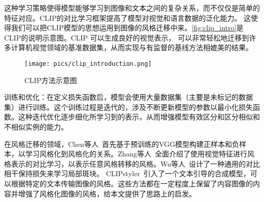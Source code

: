 这种学习策略使得模型能够学习到图像和文本之间的复杂关系，而不仅仅是简单的特征对应。CLIP的对比学习框架提高了模型对视觉和语言数据的泛化能力。
这使得我们可以把CLIP模型的思想运用到图像的风格迁移中来。\autoref{fig:clip_intro}是CLIP的说明示意图。CLIP 可以生成良好的视觉表示，
可以非常轻松地迁移到许多计算机视觉领域的基准数据集，从而实现与有监督的基线方法相媲美的结果。
\begin{figure}[htbp]
    \centering
    \texttt{[image: pics/clip\_introduction.png]}
    \caption{\label{fig:clip_intro}CLIP方法示意图}
\end{figure}
\par 训练和优化：在定义损失函数后，模型会使用大量数据集（主要是未标记的数据集）进行训练。这个训练过程是迭代的，涉及不断更新模型的参数以最小化损失函数。这种迭代优化逐步细化所学习到的表示，从而增强模型有效区分和区分相似和不相似实例的能力。
\par 在风格迁移的领域，Chen等人~\cite{chen2021artistic}首先基于预训练的VGG模型构建正样本和负样本，以学习风格化到风格化的关系。Zhang等人~\cite{zhang2022domain}全面介绍了使用视觉特征进行风格表示的对比学习，以表示任意风格转移的风格。Wu等人~\cite{wu2022ccpl}设计了一种通用的对比相干保持损失来学习局部斑块。
CLIPstyler~\cite{kwon2022clipstyler}引入了一个文本引导的合成模型，可以根据特定的文本传输图像的风格。这些方法都在一定程度上保留了内容图像的内容并增强了风格化图像的风格，给本文提供了思路上的启发。

